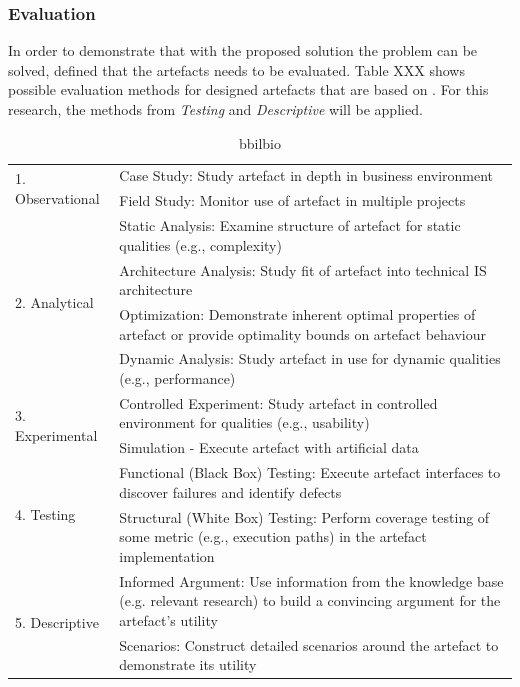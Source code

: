 
\subsubsection{Evaluation}

In order to demonstrate that with the proposed solution the problem can be solved, \cite{Hevner2010}  defined that the artefacts needs to be evaluated.
Table XXX shows possible evaluation methods for designed artefacts  that are based on \cite{Hevner2004}. For this research, the methods from \textit{Testing} and \textit{Descriptive} will be applied.


\begin{table}[h]
	\begin{center}
		\begin{tabular}{ | m{4cm} | p{10cm} | } 
			\hline
			\multirow{2}{*}{1. Observational} &
				Case Study: Study artefact in depth in business environment \\
				\cline{2-2}
				& Field Study: Monitor use of artefact in multiple projects \\
			\hline
			\multirow{4}{*}{2. Analytical} &
				Static Analysis: Examine structure of artefact for static qualities (e.g., complexity) \\
				\cline{2-2}
				& Architecture Analysis: Study fit of artefact into technical IS architecture \\
				\cline{2-2}
				& Optimization: Demonstrate inherent optimal properties of artefact or provide optimality bounds on artefact behaviour \\
				\cline{2-2}
				& Dynamic Analysis: Study artefact in use for dynamic qualities (e.g., performance) \\
			\hline
			\multirow{2}{*}{3. Experimental} &
				Controlled Experiment: Study artefact in controlled environment for qualities (e.g., usability) \\
				\cline{2-2}
				& Simulation - Execute artefact with artificial data \\
			\hline
			\multirow{2}{*}{4. Testing} &
				Functional (Black Box) Testing:  Execute artefact interfaces to discover failures and identify defects \\
				\cline{2-2}
				& Structural (White Box) Testing:  Perform coverage testing of some metric (e.g., execution paths) in the artefact implementation \\
			\hline
			\multirow{2}{*}{5. Descriptive} &
				Informed Argument:  Use information from the knowledge base (e.g. relevant research) to build a convincing argument for the artefact's utility \\
				\cline{2-2}
				& \cellcolor{green!25}Scenarios: Construct detailed scenarios around the artefact to demonstrate its utility \\
			\hline
		\end{tabular}
		\caption[here]{bbilbio}
		\label{tbl:designevaluationmethods}
	\end{center}
\end{table}


